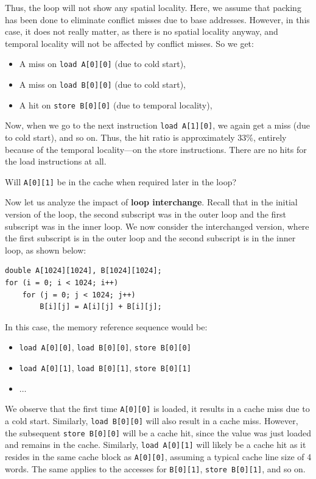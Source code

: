 \documentclass[12pt]{book}
\begin{document}
Thus, the loop will not show any spatial locality. Here, we assume that packing has been done to eliminate conflict misses due to base addresses. However, in this case, it does not really matter, as there is no spatial locality anyway, and temporal locality will not be affected by conflict misses. So we get:
\begin{itemize}
    \item A miss on \texttt{load A[0][0]} (due to cold start),
    \item A miss on \texttt{load B[0][0]} (due to cold start),
    \item A hit on \texttt{store B[0][0]} (due to temporal locality),
\end{itemize}
Now, when we go to the next instruction \texttt{load A[1][0]}, we again get a miss (due to cold start), and so on. Thus, the hit ratio is approximately $33\%$, entirely because of the temporal locality—on the store instructions. There are no hits for the load instructions at all.

Will \texttt{A[0][1]} be in the cache when required later in the loop? 

Now let us analyze the impact of \textbf{loop interchange}. Recall that in the initial version of the loop, the second subscript was in the outer loop and the first subscript was in the inner loop. We now consider the interchanged version, where the first subscript is in the outer loop and the second subscript is in the inner loop, as shown below:

\begin{lstlisting}[style=cppstyle]
double A[1024][1024], B[1024][1024];
for (i = 0; i < 1024; i++)
    for (j = 0; j < 1024; j++)
        B[i][j] = A[i][j] + B[i][j];
\end{lstlisting}

In this case, the memory reference sequence would be:
\begin{itemize}
    \item \texttt{load A[0][0]}, \texttt{load B[0][0]}, \texttt{store B[0][0]}
    \item \texttt{load A[0][1]}, \texttt{load B[0][1]}, \texttt{store B[0][1]}
    \item $\dots$
\end{itemize}

We observe that the first time \texttt{A[0][0]} is loaded, it results in a cache miss due to a cold start. Similarly, \texttt{load B[0][0]} will also result in a cache miss. However, the subsequent \texttt{store B[0][0]} will be a cache hit, since the value was just loaded and remains in the cache. Similarly, \texttt{load A[0][1]} will likely be a cache hit as it resides in the same cache block as \texttt{A[0][0]}, assuming a typical cache line size of 4 words. The same applies to the accesses for \texttt{B[0][1]}, \texttt{store B[0][1]}, and so on.
\end{document}

